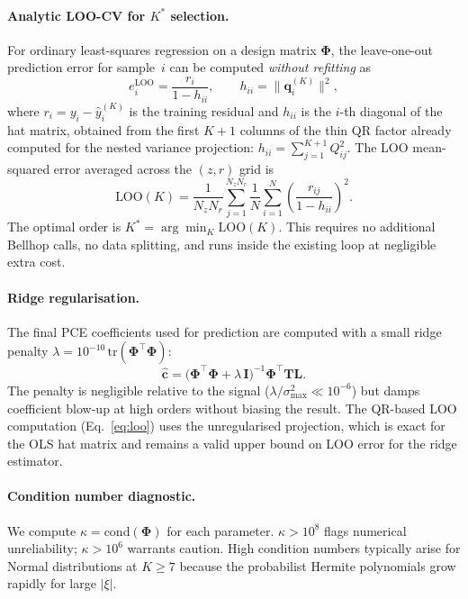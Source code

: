\documentclass[11pt,a4paper]{article}
\begin{document}
\paragraph{Analytic LOO-CV for $K^*$ selection.}
For ordinary least-squares regression on a design matrix $\boldsymbol\Phi$,
the leave-one-out prediction error for sample~$i$ can be computed \emph{without
refitting} as
\begin{equation}
  e_i^{\text{LOO}} = \frac{r_i}{1 - h_{ii}},
  \qquad h_{ii} = \lVert \mathbf{q}_i^{(K)}\rVert^2,
  \label{eq:loo}
\end{equation}
where $r_i = y_i - \hat{y}_i^{(K)}$ is the training residual and
$h_{ii}$ is the $i$-th diagonal of the hat matrix, obtained from the first
$K+1$ columns of the thin QR factor already computed for the nested variance
projection: $h_{ii} = \sum_{j=1}^{K+1} Q_{ij}^2$.
The LOO mean-squared error averaged across the $(z,r)$ grid is
\begin{equation}
  \text{LOO}(K) = \frac{1}{N_z N_r}\sum_{j=1}^{N_z N_r}
                  \frac{1}{N}\sum_{i=1}^{N}
                  \left(\frac{r_{ij}}{1-h_{ii}}\right)^2.
  \label{eq:loo_mean}
\end{equation}
The optimal order is $K^* = \arg\min_K \text{LOO}(K)$.
This requires no additional Bellhop calls, no data splitting, and runs inside the
existing loop at negligible extra cost.

\paragraph{Ridge regularisation.}
The final PCE coefficients used for prediction are computed with a small ridge
penalty $\lambda = 10^{-10}\,\mathrm{tr}(\boldsymbol\Phi^\top\boldsymbol\Phi)$:
\begin{equation}
  \hat{\mathbf{c}} = \bigl(\boldsymbol\Phi^\top\boldsymbol\Phi
                    + \lambda\,\mathbf{I}\bigr)^{-1}
                    \boldsymbol\Phi^\top \mathbf{TL}.
  \label{eq:ridge}
\end{equation}
The penalty is negligible relative to the signal ($\lambda/\sigma_{\max}^2 \ll 10^{-6}$)
but damps coefficient blow-up at high orders without biasing the result.
The QR-based LOO computation (Eq.~\ref{eq:loo}) uses the unregularised projection,
which is exact for the OLS hat matrix and remains a valid upper bound on LOO error
for the ridge estimator.

\paragraph{Condition number diagnostic.}
We compute $\kappa = \mathrm{cond}(\boldsymbol\Phi)$ for each parameter.
$\kappa > 10^8$ flags numerical unreliability; $\kappa > 10^6$ warrants caution.
High condition numbers typically arise for Normal distributions at $K \geq 7$
because the probabilist Hermite polynomials grow rapidly for large
$\lvert\xi\rvert$.
\end{document}
